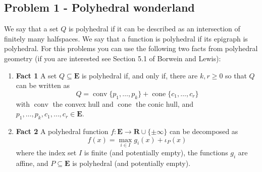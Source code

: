 \documentclass[11pt]{article}
\newcommand{\RR}{\mathbf{R}}
\newcommand{\EEE}{\mathbf{E}}
\newcommand{\conv}{\operatorname{conv}}
\newcommand{\cone}{\operatorname{cone}}
\begin{document}
\subsection*{Problem 1 - Polyhedral wonderland}
\label{sec:org18c52d6}
We say that a set \(Q\) is polyhedral if it can be described as an intersection of finitely many halfspaces. We say that a function is polyhedral if its epigraph is polyhedral. For this problems you can use the following two facts from polyhedral geometry (if you are interested see Section 5.1 of Borwein and Lewis):
\begin{enumerate}
\item[] \textbf{Fact 1} A set $Q \subseteq \EEE$ is polyhedral if, and only if, there are $k, r \geq 0$ so that $Q$ can be written as
$$
Q = \conv\{p_{1}, \dots, p_{k}\} + \cone \{c_{1}, \dots, c_{r}\}
$$
with $\conv$ the convex hull and $\cone$ the conic hull, and $p_{1}, \dots, p_{k}, c_{1}, \dots, c_{r} \in \EEE$.
\item[] \textbf{Fact 2} A polyhedral function $f \colon \EEE \rightarrow \RR \cup \{\pm \infty\}$ can be decomposed as
$$
f(x) = \max_{i \in I} g_{i}(x) + \iota_{P}(x)
$$
where the index set $I$ is finite (and potentially empty), the functions $g_{i}$ are affine, and $P \subseteq \EEE$ is polyhedral (and potentially empty).
\end{enumerate}
\end{document}
